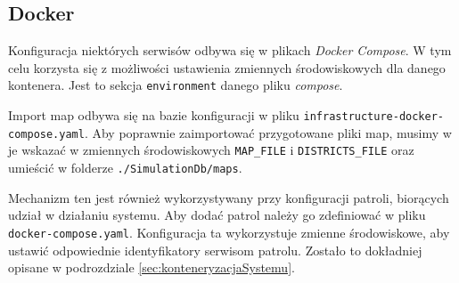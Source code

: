 \subsection{Docker}

\par Konfiguracja niektórych serwisów odbywa się w plikach \emph{Docker Compose}. W tym celu korzysta się z możliwości ustawienia zmiennych środowiskowych dla danego kontenera. Jest to sekcja \texttt{environment} danego pliku \emph{compose}.

\par Import map odbywa się na bazie konfiguracji w pliku \texttt{infrastructure-docker-compose.yaml}. Aby poprawnie zaimportować przygotowane pliki map, musimy w je wskazać w zmiennych środowiskowych \texttt{MAP\_FILE} i \texttt{DISTRICTS\_FILE} oraz umieścić w folderze \texttt{./SimulationDb/maps}.

\par Mechanizm ten jest również wykorzystywany przy konfiguracji patroli, biorących udział w działaniu systemu. Aby dodać patrol należy go zdefiniować w pliku \texttt{docker-compose.yaml}. Konfiguracja ta wykorzystuje zmienne środowiskowe, aby ustawić odpowiednie identyfikatory serwisom patrolu. Zostało to dokładniej opisane w podrozdziale \ref{sec:konteneryzacjaSystemu}.

